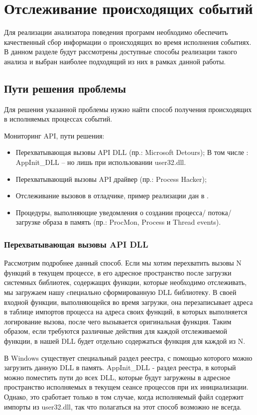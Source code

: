 \section {Отслеживание происходящих событий}
Для реализации анализатора поведения программ необходимо обеспечить качественный сбор информации о происходящих во время исполнения событиях. В данном разделе будут рассмотрены доступные способы реализации такого анализа и выбран наиболее подходящий из них в рамках данной работы.
\subsection {Пути решения проблемы}
Для решения указанной проблемы нужно найти способ получения происходящих в исполняемых процессах событий. 

Мониторинг API, пути решения:
\begin {itemize}
	\item Перехватывающая вызовы API DLL (пр.: Microsoft Detours);
	В том числе : AppInit\_DLL – но лишь при использовании user32.dll.
	\item Перехватывающий вызовы API драйвер (пр.: Process Hacker);
	\item Отслеживание вызовов в отладчике, пример реализации дан в \cite{MALWAREBOOK}.
	\item Процедуры, выполняющие уведомления о создании процесса/ потока/ загрузке образа в память (пр.:
 	ProcMon, Process и Thread events).
\end {itemize}

\subsubsection {Перехватывающая вызовы API DLL}
Рассмотрим подробнее данный способ. Если мы хотим перехватить вызовы N функций в текущем процессе,
 в его адресное пространство после загрузки системных библиотек, содержащих функции, которые необходимо
 отслеживать, мы загружаем нашу cпециально сформированную DLL библиотеку. В своей входной функции,
 выполняющейся во время загрузки, она перезаписывает адреса в таблице импортов процесса на адреса своих
 функций, в которых выполняется логирование вызова, после чего вызывается оригинальная функция. Таким образом, если требуются различные действия для каждой отслеживаемой функции, в нашей DLL будет отдельно
 содержаться функция для каждой из N.
 
В Windows существует специальный раздел реестра, с помощью которого можно загрузить данную DLL в память. AppInit\_DLL - раздел реестра, в который можно поместить пути до всех DLL, которые будут загружены в адресное пространство исполняемых в текущем сеансе процессов при их инициализации. Однако, это сработает только в том случае, когда исполняемый файл содержит импорты из user32.dll, так что полагаться на этот способ возможно не всегда.
